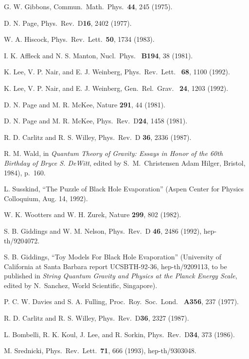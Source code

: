 \begin{thebibliography}{999}
 G. W. Gibbons, Commun.\ Math.\ Phys.\ {\bf 44}, 245
(1975).

 D. N. Page, Phys.\ Rev.\ D{\bf 16}, 2402 (1977).

 W. A. Hiscock, Phys.\ Rev.\ Lett.\ {\bf 50}, 1734
(1983).

 I. K. Affleck and N. S. Manton, Nucl.\ Phys.\ {\bf
B194}, 38
(1981).

 K. Lee, V. P. Nair, and E. J. Weinberg, Phys.\ Rev.\
Lett.\
{\bf
68}, 1100 (1992).

 K. Lee, V. P. Nair, and E. J. Weinberg, Gen.\ Rel.\
Grav.\ {\bf
24}, 1203 (1992).

 D. N. Page and M. R. McKee, Nature {\bf 291}, 44
(1981).

\bibitem{PM2} D. N. Page and M. R. McKee, Phys.\ Rev.\ D{\bf 24},
1458 (1981).

\bibitem{CW87} R. D. Carlitz and R. S. Willey, Phys.\ Rev.\ D{\bf
36}, 2336
(1987).

 R. M. Wald, in {\em Quantum Theory of Gravity:
Essays in
Honor
of the 60th Birthday of Bryce S. DeWitt}, edited by S.~M.~Christensen
Adam
Hilger, Bristol, 1984), p.~160.

 L. Susskind, ``The Puzzle of Black Hole
Evaporation'' (Aspen
Center for Physics Colloquium, Aug. 14, 1992).

\bibitem{WooZur}  W. K. Wootters and W. H. Zurek, Nature {\bf 299},
802
(1982).

 S. B. Giddings and W. M. Nelson, Phys.\ Rev.\ D{\bf
46}, 2486
(1992), hep-th/9204072.

 S. B. Giddings, ``Toy Models For Black Hole
Evaporation''
(University of California at Santa Barbara report UCSBTH-92-36,
hep-th/9209113,
to be published in {\em String Quantum Gravity and Physics at the
Planck Energy
Scale}, edited by N.~Sanchez, World Scientific, Singapore).

 P. C. W. Davies and S. A. Fulling, Proc.\ Roy.\
Soc.\ Lond.\
{\bf
A356}, 237 (1977).

\bibitem{CW2} R. D. Carlitz and R. S. Willey, Phys.\ Rev.\ D{\bf 36},
2327
(1987).

 L. Bombelli, R. K. Koul, J. Lee, and R. Sorkin,
Phys.\ Rev.\ D{\bf 34}, 373 (1986).

 M. Srednicki, Phys.\ Rev.\ Lett.\ {\bf 71}, 666
(1993),
hep-th/9303048.


\end{thebibliography}
